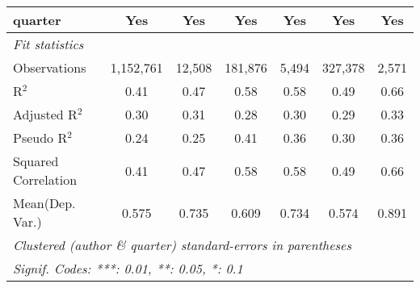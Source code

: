 \begin{tabular}{lcccccc}
   quarter                                                    & Yes            & Yes           & Yes            & Yes     & Yes            & Yes\\  
   \midrule
   \emph{Fit statistics}\\
   Observations                                               & 1,152,761      & 12,508        & 181,876        & 5,494   & 327,378        & 2,571\\  
   R$^2$                                                      & 0.41           & 0.47          & 0.58           & 0.58    & 0.49           & 0.66\\  
   Adjusted R$^2$                                             & 0.30           & 0.31          & 0.28           & 0.30    & 0.29           & 0.33\\  
   Pseudo R$^2$                                               & 0.24           & 0.25          & 0.41           & 0.36    & 0.30           & 0.36\\  
   Squared Correlation                                        & 0.41           & 0.47          & 0.58           & 0.58    & 0.49           & 0.66\\  
Mean(Dep. Var.) & 0.575 & 0.735 & 0.609 & 0.734 & 0.574 & 0.891 \\
   \midrule \midrule
   \multicolumn{7}{l}{\emph{Clustered (author \& quarter) standard-errors in parentheses}}\\
   \multicolumn{7}{l}{\emph{Signif. Codes: ***: 0.01, **: 0.05, *: 0.1}}\\
\end{tabular}
\par\endgroup
